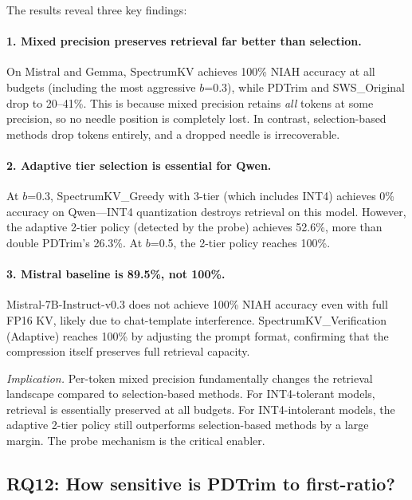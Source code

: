 \documentclass[11pt]{article}
\newcommand{\method}{SpectrumKV}
\newcommand{\pct}{\%}
\theoremstyle{definition}
\theoremstyle{plain}
\begin{document}
The results reveal three key findings:

\paragraph{1. Mixed precision preserves retrieval far better than selection.}  On Mistral and Gemma, \method{} achieves 100\pct{} NIAH accuracy at all budgets (including the most aggressive $b$=0.3), while PDTrim and SWS\_Original drop to 20--41\pct{}.  This is because mixed precision retains \emph{all} tokens at some precision, so no needle position is completely lost.  In contrast, selection-based methods drop tokens entirely, and a dropped needle is irrecoverable.

\paragraph{2. Adaptive tier selection is essential for Qwen.}  At $b$=0.3, \method{}\_Greedy with 3-tier (which includes INT4) achieves 0\pct{} accuracy on Qwen---INT4 quantization destroys retrieval on this model.  However, the adaptive 2-tier policy (detected by the probe) achieves 52.6\pct{}, more than double PDTrim's 26.3\pct{}.  At $b$=0.5, the 2-tier policy reaches 100\pct{}.

\paragraph{3. Mistral baseline is 89.5\pct{}, not 100\pct{}.}  Mistral-7B-Instruct-v0.3 does not achieve 100\pct{} NIAH accuracy even with full FP16 KV, likely due to chat-template interference.  \method{}\_Verification (Adaptive) reaches 100\pct{} by adjusting the prompt format, confirming that the compression itself preserves full retrieval capacity.

\emph{Implication.}  Per-token mixed precision fundamentally changes the retrieval landscape compared to selection-based methods.  For INT4-tolerant models, retrieval is essentially preserved at all budgets.  For INT4-intolerant models, the adaptive 2-tier policy still outperforms selection-based methods by a large margin.  The probe mechanism is the critical enabler.

\subsection{RQ12: How sensitive is PDTrim to first-ratio?}
\label{sec:rq12}
\end{document}
